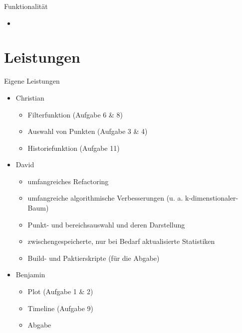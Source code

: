 \documentclass{beamer}
\begin{document}
    \begin{frame}{Funktionalität}
    	\begin{itemize}
    		\setlength\itemsep{1em}
    		\item 
    	\end{itemize}
    \end{frame}
    
    \section{Leistungen} 
    \begin{frame}{Eigene Leistungen}
    	\begin{itemize}
	    	\setlength\itemsep{1em}
	    	\item Christian
	    	\begin{itemize}
	    		\item Filterfunktion (Aufgabe 6 \& 8)
	    		\item Auswahl von Punkten (Aufgabe 3 \& 4)
	    		\item Historiefunktion (Aufgabe 11)
	    	\end{itemize}
    		\item David
    		\begin{itemize}
    			\item umfangreiches Refactoring
    			\item umfangreiche algorithmische Verbesserungen (u. a. k-dimenstionaler-Baum)
    			\item Punkt- und bereichsauswahl und deren Darstellung
    			\item zwischengespeicherte, nur bei Bedarf aktualisierte Statistiken
    			\item Build- und Paktierskripte (für die Abgabe)
    		\end{itemize}
    		\item Benjamin
    		\begin{itemize}
    			\item Plot (Aufgabe 1 \& 2)
    			\item Timeline (Aufgabe 9)
    			\item Abgabe
    		\end{itemize}
    	\end{itemize}
    \end{frame}
    
\end{document}
